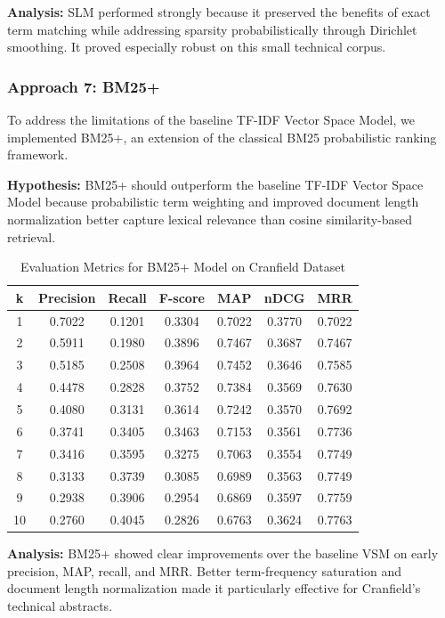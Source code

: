 \textbf{Analysis:}
SLM performed strongly because it preserved the benefits of exact term matching while addressing sparsity probabilistically through Dirichlet smoothing. It proved especially robust on this small technical corpus.

\subsubsection{Approach 7: BM25+}
To address the limitations of the baseline TF-IDF Vector Space Model, we implemented BM25+, an extension of the classical BM25 probabilistic ranking framework.

\textbf{Hypothesis:} BM25+ should outperform the baseline TF-IDF Vector Space Model because probabilistic term weighting and improved document length normalization better capture lexical relevance than cosine similarity-based retrieval.

\begin{table}[H]
\centering
\begin{tabular}{|c|c|c|c|c|c|c|}
\hline
k & Precision & Recall & F-score & MAP & nDCG & MRR \\
\hline
1 & 0.7022 & 0.1201 & 0.3304 & 0.7022 & 0.3770 & 0.7022 \\
2 & 0.5911 & 0.1980 & 0.3896 & 0.7467 & 0.3687 & 0.7467 \\
3 & 0.5185 & 0.2508 & 0.3964 & 0.7452 & 0.3646 & 0.7585 \\
4 & 0.4478 & 0.2828 & 0.3752 & 0.7384 & 0.3569 & 0.7630 \\
5 & 0.4080 & 0.3131 & 0.3614 & 0.7242 & 0.3570 & 0.7692 \\
6 & 0.3741 & 0.3405 & 0.3463 & 0.7153 & 0.3561 & 0.7736 \\
7 & 0.3416 & 0.3595 & 0.3275 & 0.7063 & 0.3554 & 0.7749 \\
8 & 0.3133 & 0.3739 & 0.3085 & 0.6989 & 0.3563 & 0.7749 \\
9 & 0.2938 & 0.3906 & 0.2954 & 0.6869 & 0.3597 & 0.7759 \\
10 & 0.2760 & 0.4045 & 0.2826 & 0.6763 & 0.3624 & 0.7763 \\
\hline
\end{tabular}
\caption{Evaluation Metrics for BM25+ Model on Cranfield Dataset}
\end{table}

\textbf{Analysis:}
BM25+ showed clear improvements over the baseline VSM on early precision, MAP, recall, and MRR. Better term-frequency saturation and document length normalization made it particularly effective for Cranfield's technical abstracts.

